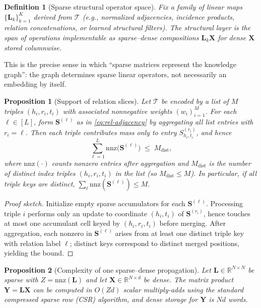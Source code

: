 \documentclass[11pt]{article}
\newtheorem{definition}{Definition}
\newtheorem{proposition}{Proposition}
\begin{document}
\begin{definition}[Sparse structural operator space]
Fix a family of linear maps $\{ \bm{L}_k \}_{k=1}^{K}$ derived from $\mathcal{T}$ (e.g., normalized adjacencies, incidence products, relation concatenations, or learned structural filters).
The \emph{structural layer} is the span of operations implementable as sparse--dense compositions $\bm{L}_k \bm{X}$ for dense $\bm{X}$ stored columnwise.
\end{definition}

This is the precise sense in which ``sparse matrices represent the knowledge graph'': the graph determines sparse linear operators, not necessarily an embedding by itself.

\begin{proposition}[Support of relation slices]
\label{prop:nnz-bound}
Let $\mathcal{T}$ be encoded by a list of $M$ triples $(h_i,r_i,t_i)$ with associated nonnegative weights $(w_i)_{i=1}^M$.
For each $\ell \in [L]$, form $\bm{S}^{(\ell)}$ as in \eqref{eq:rel-adjacency} by aggregating all list entries with $r_i = \ell$.
Then each triple contributes mass only to entry $S^{(r_i)}_{h_i,t_i}$, and hence
\begin{equation}
  \sum_{\ell=1}^{L} \mathrm{nnz}\bigl(\bm{S}^{(\ell)}\bigr) \;\le\; M_{\mathrm{dist}},
\end{equation}
where $\mathrm{nnz}(\cdot)$ counts nonzero entries \emph{after} aggregation and $M_{\mathrm{dist}}$ is the number of distinct index triples $(h_i,r_i,t_i)$ in the list \textup{(}so $M_{\mathrm{dist}} \le M$\textup{)}.
In particular, if all triple keys are distinct, $\sum_\ell \mathrm{nnz}(\bm{S}^{(\ell)}) \le M$.
\end{proposition}

\begin{proof}[Proof sketch]
Initialize empty sparse accumulators for each $\bm{S}^{(\ell)}$.
Processing triple $i$ performs only an update to coordinate $(h_i,t_i)$ of $\bm{S}^{(r_i)}$, hence touches at most one accumulant cell keyed by $(h_i,r_i,t_i)$ before merging.
After aggregation, each nonzero in $\bm{S}^{(\ell)}$ arises from at least one distinct triple key with relation label $\ell$; distinct keys correspond to distinct merged positions, yielding the bound.
\end{proof}

\begin{proposition}[Complexity of one sparse--dense propagation]
\label{prop:spmm}
Let $\bm{L} \in \mathbb{R}^{N \times N}$ be sparse with $Z = \mathrm{nnz}(\bm{L})$ and let $\bm{X} \in \mathbb{R}^{N \times d}$ be dense.
The matrix product $\bm{Y} = \bm{L}\bm{X}$ can be computed in $O(Zd)$ scalar multiply-adds using the standard compressed sparse row \textup{(CSR)} algorithm, and dense storage for $\bm{Y}$ is $Nd$ words.
\end{proposition}
\end{document}
